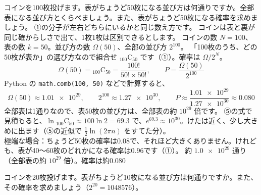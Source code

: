 \label{ph:熱-15:ex2}
\begin{phreidai}
コインを100枚投げます。表がちょうど50枚になる並び方は何通りですか。全部表になる並び方とくらべましょう。また、表がちょうど50枚になる確率を求めましょう。
\phbamen
①の分子が左右どちらにいるかと同じ数え方です。
\phmushi
コインは表と裏が同じ確からしさで出て、1枚1枚は区別できるとします。
\phzu
コインの数 $N=100$、表の数 $k=50$。並び方の数 $\Omega(50)$、全部の並び方 $2^{100}$。
\phriyu
「100枚のうち、どの50枚が表か」の選び方なので組合せ ${}_{100}\mathrm{C}_{50}$ です（①）。確率は $\Omega/2^N$。
\phtateru
\[\Omega(50)={}_{100}\mathrm{C}_{50}=\frac{100!}{50!\times50!},\qquad P=\frac{\Omega(50)}{2^{100}}\]
\phtoku
Python の \texttt{math.comb(100, 50)} などで計算すると、
\[\Omega(50)\approx\num{1.01e29},\qquad 2^{100}\approx\num{1.27e30},\qquad P\approx\frac{\num{1.01e29}}{\num{1.27e30}}\approx0.080\]
全部表は1通りなので、表50枚の並び方は、全部表の約 $10^{29}$ 倍です。
\phtashikame
⑤の式で見積もると、$\ln{}_{100}\mathrm{C}_{50}\approx100\ln2=69.3$ で、$e^{69.3}\approx10^{30}$。けたは近く、少し大きめに出ます（⑤の近似で $\tfrac{1}{2}\ln(2\pi n)$ をすてた分）。\\
極端な場合：ちょうど50枚の確率は0.08で、それほど大きくありません。けれども、表が40〜60枚のどれかになる確率は0.96です（①）。
\kotae 約 $\num{1.0e29}$ 通り（全部表の約 $10^{29}$ 倍）。確率は約0.080
\end{phreidai}
\begin{jibun}
コインを20枚投げます。表がちょうど10枚になる並び方は何通りですか。また、その確率を求めましょう（$2^{20}=\num{1048576}$）。
\end{jibun}

